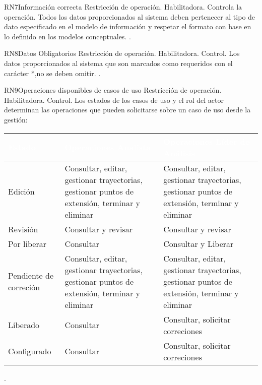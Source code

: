 \begin{BussinesRule}{RN7}{Información correcta}
	\BRitem[Tipo:] Restricción de operación. 
	\BRitem[Clase:] Habilitadora. 
	\BRitem[Nivel:] Controla la operación. %
	\BRitem[Descripción:]	Todos los datos proporcionados al sistema deben pertenecer al tipo de dato especificado en el modelo de información y respetar el formato con base en lo definido en los modelos conceptuales.
	 .
\end{BussinesRule}

\begin{BussinesRule}{RN8}{Datos Obligatorios} 
	\BRitem[Tipo:] Restricción de operación. 
	\BRitem[Clase:] Habilitadora. 
	\BRitem[Nivel:] Control. %
	\BRitem[Descripción:] Los datos proporcionados al sistema que son marcados como requeridos con el carácter *,no se deben omitir.
	 . 
\end{BussinesRule}



\begin{BussinesRule}{RN9}{Operaciones disponibles de casos de uso} 
	\BRitem[Tipo:] Restricción de operación. 
	\BRitem[Clase:] Habilitadora. 
	\BRitem[Nivel:] Control. %
	\BRitem[Descripción:] Los estados de los casos de uso y el rol del actor determinan las operaciones que pueden solicitarse sobre un caso de uso desde la gestión:
	
	\begin{table}[H]
		\centering
		\begin{tabular}{|p{5cm}| p{5cm}| p{5cm}|}
			\hline
			\rowcolor{blue} \textcolor{white}{\textbf{Estado}} & \textcolor{white}{\textbf{Operaciones Analista}} & \textcolor{white}{\textbf{Operaciones Líder de Análisis}} \\
			\hline
			Edición & Consultar, editar, gestionar trayectorias, gestionar puntos de extensión, terminar y eliminar & Consultar, editar, gestionar trayectorias, gestionar puntos de extensión, terminar y eliminar \\
			\hline
			Revisión & Consultar y revisar & Consultar y revisar\\
			\hline
			Por liberar & Consultar & Consultar y Liberar\\
			\hline
			Pendiente de correción & Consultar, editar, gestionar trayectorias, gestionar puntos de extensión, terminar y eliminar & Consultar, editar, gestionar trayectorias, gestionar puntos de extensión, terminar y eliminar\\
			\hline
			Liberado & Consultar & Consultar, solicitar correciones\\
			\hline
			Configurado & Consultar & Consultar, solicitar correciones\\
			\hline
		\end{tabular}
	\end{table}

	 \UCref{}{}.
	
\end{BussinesRule}
	
